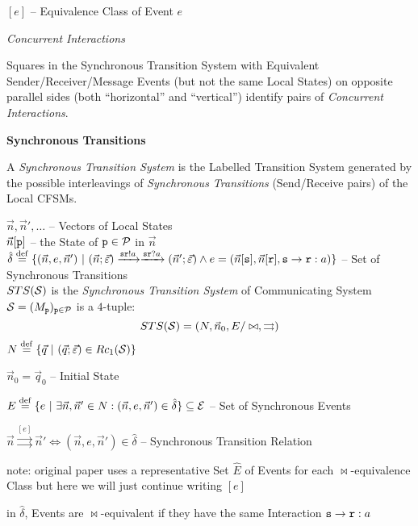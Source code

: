 $[e]$ -- Equivalence Class of Event $e$


\emph{Concurrent Interactions}

Squares in the Synchronous Transition System with Equivalent
Sender/Receiver/Message Events (but not the same Local States) on
opposite parallel sides (both ``horizontal'' and ``vertical'')
identify pairs of \emph{Concurrent Interactions}.


\textbf{Synchronous Transitions}

A \emph{Synchronous Transition System} is the Labelled Transition
System generated by the possible interleavings of \emph{Synchronous
  Transitions} (Send/Receive pairs) of the Local CFSMs.

$\vec{n}, \vec{n}', \ldots$ -- Vectors of Local States \\
$\vec{n}[\mathtt{p}]$ -- the State of $\mathtt{p} \in \mathcal{P}$ in
$\vec{n}$ \\
$\hat{\delta} \stackrel{\mathrm{def}}= \{ (\vec{n},e,\vec{n}')
\ |\ (\vec{n};\vec{\varepsilon})
    \xrightarrow{\mathtt{sr}!a} \xrightarrow{\mathtt{sr}?a}
     (\vec{n}';\vec{\varepsilon}) \wedge
    e = (\vec{n}[\mathtt{s}],\vec{n}[\mathtt{r}],
      \mathtt{s}\rightarrow\mathtt{r}:a)
\}$ -- Set of Synchronous Transitions \\

$STS(\mathcal{S})$ is the \emph{Synchronous Transition System} of
Communicating System $\mathcal{S} =
(M_\mathtt{p})_{\mathtt{p}\in\mathcal{P}}$ is a $4$-tuple:
\[
  STS(\mathcal{S}) = (N,\vec{n}_0,E/\bowtie,\rightrightarrows)
\]
$N \defeq \{ \vec{q} \ |\ (\vec{q};\vec{\varepsilon}) \in
Rc_1(\class{S}) \}$ %

$\vec{n}_0 = \vec{q}_0$ -- Initial State

$E \stackrel{\mathrm{def}}= \{ e \ |\ \exists\vec{n},\vec{n}' \in N :
  (\vec{n},e,\vec{n}') \in \hat{\delta} \} \subseteq \mathcal{E}$
-- Set of Synchronous Events %

$\vec{n} \stackrel{[e]}{\rightrightarrows} \vec{n}'
  \Longleftrightarrow (\vec{n},e,\vec{n}') \in \hat{\delta}$ --
Synchronous Transition Relation %

note: original paper uses a representative Set $\hat{E}$ of Events for
each $\bowtie$-equivalence Class but here we will just continue
writing $[e]$

in $\hat{\delta}$, Events are $\bowtie$-equivalent if they have the
same Interaction $\mathtt{s}\rightarrow\mathtt{r} : a$

